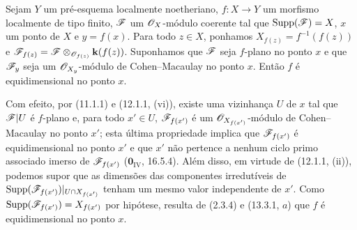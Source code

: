 \begin{proposition}[15.4.1]
\label{IV.15.4.1}
Sejam $Y$ um pré-esquema localmente noetheriano, $f:X\to Y$ um morfismo localmente de tipo finito, $\mathscr{F}$ um $\mathscr{O}_X$-módulo coerente tal que $\operatorname{Supp}(\mathscr{F})=X$, $x$ um ponto de $X$ e $y=f(x)$. Para todo $z\in X$, ponhamos $X_{f(z)}=f^{-1}(f(z))$ e $\mathscr{F}_{f(z)}=\mathscr{F}\otimes_{\mathscr{O}_{f(z)}}\mathbf{k}(f(z))$. Suponhamos que $\mathscr{F}$ seja $f$-plano no ponto $x$ e que $\mathscr{F}_y$ seja um $\mathscr{O}_{X_y}$-módulo de Cohen--Macaulay no ponto $x$. Então $f$ é
equidimensional no ponto $x$.

Com efeito, por (11.1.1) e (12.1.1, (vi)), existe uma vizinhança $U$ de $x$ tal que $\mathscr{F}|U$ é $f$-plano e, para todo $x'\in U$, $\mathscr{F}_{f(x')}$ é um $\mathscr{O}_{X_{f(x')}}$-módulo de Cohen--Macaulay no ponto $x'$; esta última propriedade implica que $\mathscr{F}_{f(x')}$ é equidimensional no ponto $x'$ e que $x'$ não pertence a nenhum ciclo primo associado imerso de $\mathscr{F}_{f(x')}$ ($\mathbf{0}_{\mathrm{IV}}$, 16.5.4). Além disso, em virtude de (12.1.1, (ii)), podemos supor que as dimensões das componentes irredutíveis de $\operatorname{Supp}(\mathscr{F}_{f(x')})|_{U\cap X_{f(x')}}$ tenham um mesmo valor independente de $x'$. Como $\operatorname{Supp}(\mathscr{F}_{f(x')})=X_{f(x')}$ por hipótese, resulta de (2.3.4) e (13.3.1, $a$) que $f$ é equidimensional no ponto $x$.
\end{proposition}

